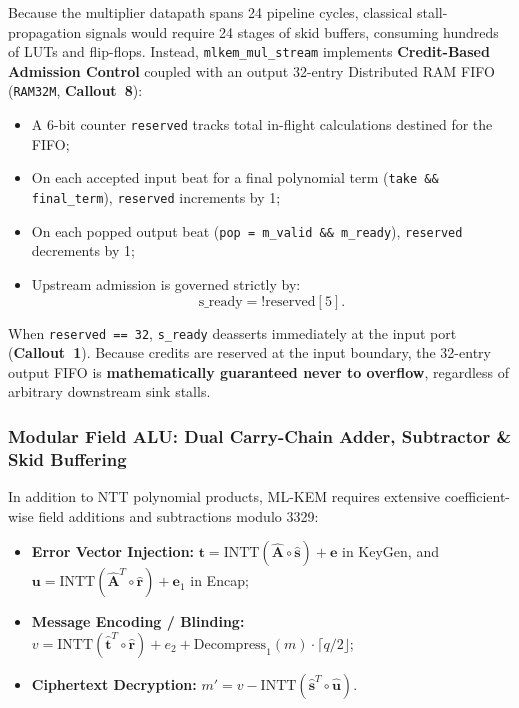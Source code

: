 Because the multiplier datapath spans 24 pipeline cycles, classical stall-propagation signals would require 24 stages of skid buffers, consuming hundreds of LUTs and flip-flops. Instead, \texttt{mlkem\_mul\_stream} implements \textbf{Credit-Based Admission Control} coupled with an output 32-entry Distributed RAM FIFO (\texttt{RAM32M}, \textbf{Callout~8}):
\begin{itemize}
    \item A 6-bit counter \texttt{reserved} tracks total in-flight calculations destined for the FIFO;
    \item On each accepted input beat for a final polynomial term (\texttt{take \&\& final\_term}), \texttt{reserved} increments by 1;
    \item On each popped output beat (\texttt{pop = m\_valid \&\& m\_ready}), \texttt{reserved} decrements by 1;
    \item Upstream admission is governed strictly by:
    \begin{equation}
    \text{s\_ready} = !\text{reserved}[5].
    \end{equation}
\end{itemize}
When \texttt{reserved == 32}, \texttt{s\_ready} deasserts immediately at the input port (\textbf{Callout~1}). Because credits are reserved at the input boundary, the 32-entry output FIFO is \textbf{mathematically guaranteed never to overflow}, regardless of arbitrary downstream sink stalls.

\subsubsection{Modular Field ALU: Dual Carry-Chain Adder, Subtractor \& Skid Buffering}
\label{sec05b_field_alu}

In addition to NTT polynomial products, \mbox{ML-KEM} requires extensive coefficient-wise field additions and subtractions modulo 3329:
\begin{itemize}
    \item \textbf{Error Vector Injection:} $\mathbf{t} = \text{INTT}(\hat{\mathbf{A}} \circ \hat{\mathbf{s}}) + \mathbf{e}$ in KeyGen, and $\mathbf{u} = \text{INTT}(\hat{\mathbf{A}}^T \circ \hat{\mathbf{r}}) + \mathbf{e}_1$ in Encap;
    \item \textbf{Message Encoding / Blinding:} $v = \text{INTT}(\hat{\mathbf{t}}^T \circ \hat{\mathbf{r}}) + e_2 + \text{Decompress}_1(m) \cdot \lceil q/2 \rfloor$;
    \item \textbf{Ciphertext Decryption:} $m' = v - \text{INTT}(\hat{\mathbf{s}}^T \circ \hat{\mathbf{u}})$.
\end{itemize}

